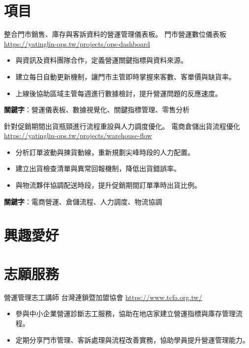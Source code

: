 \documentclass[a4paper, serif, 10pt]{moderncv}
\begin{document}
\section{項目}

        {整合門市銷售、庫存與客訴資料的營運管理儀表板。}
        {門市營運數位儀表板}
        {\url{https://yatinglin-ops.tw/projects/ops-dashboard}}
        {}
        {\begin{itemize}
\item 與資訊及資料團隊合作，定義營運關鍵指標與資料來源。
\item 建立每日自動更新機制，讓門市主管即時掌握來客數、客單價與缺貨率。
\item 上線後協助區域主管每週進行數據檢討，提升營運問題的反應速度。
\end{itemize}
\textbf{關鍵字}：營運儀表板、數據視覺化、關鍵指標管理、零售分析}

        {針對促銷期間出貨瓶頸進行流程重設與人力調度優化。}
        {電商倉儲出貨流程優化}
        {\url{https://yatinglin-ops.tw/projects/warehouse-flow}}
        {}
        {\begin{itemize}
\item 分析訂單波動與揀貨動線，重新規劃尖峰時段的人力配置。
\item 建立出貨檢查清單與異常回報機制，降低出貨錯誤率。
\item 與物流夥伴協調配送時段，提升促銷期間訂單準時出貨比例。
\end{itemize}
\textbf{關鍵字}：電商營運、倉儲流程、人力調度、物流協調}
\section{興趣愛好}

\section{志願服務}

        {營運管理志工講師}
        {台灣連鎖暨加盟協會}
        {\url{https://www.tcfa.org.tw/}}
        {}
        {\begin{itemize}
\item 參與中小企業營運診斷志工服務，協助在地店家建立營運指標與庫存管理流程。
\item 定期分享門市管理、客訴處理與流程改善實務，協助學員提升營運管理能力。
\end{itemize}}
    
\end{document}
